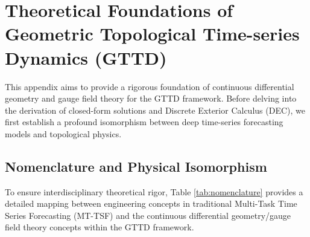 \documentclass{article}
\begin{document}
\appendix
\section{Theoretical Foundations of Geometric Topological Time-series Dynamics (GTTD)}

This appendix aims to provide a rigorous foundation of continuous differential geometry and gauge field theory for the GTTD framework. Before delving into the derivation of closed-form solutions and Discrete Exterior Calculus (DEC), we first establish a profound isomorphism between deep time-series forecasting models and topological physics.

\subsection*{Nomenclature and Physical Isomorphism}

To ensure interdisciplinary theoretical rigor, Table \ref{tab:nomenclature} provides a detailed mapping between engineering concepts in traditional Multi-Task Time Series Forecasting (MT-TSF) and the continuous differential geometry/gauge field theory concepts within the GTTD framework.
\end{document}
